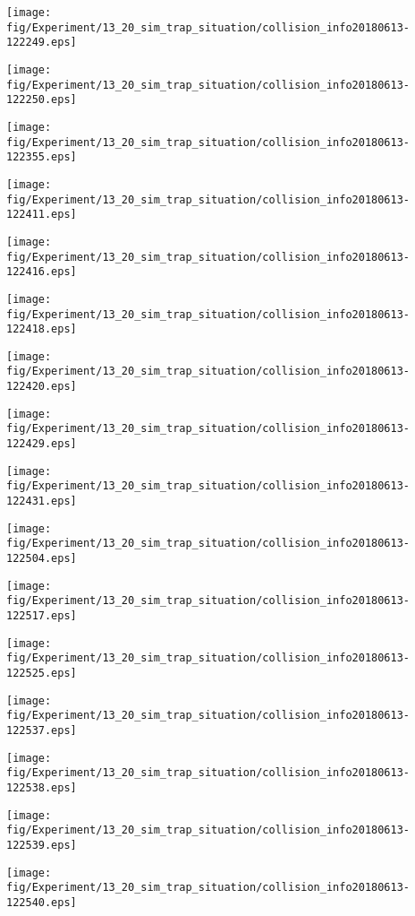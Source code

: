 \texttt{[image: fig/Experiment/13\_20\_sim\_trap\_situation/collision\_info20180613-122249.eps]}

\texttt{[image: fig/Experiment/13\_20\_sim\_trap\_situation/collision\_info20180613-122250.eps]}

\texttt{[image: fig/Experiment/13\_20\_sim\_trap\_situation/collision\_info20180613-122355.eps]}

\texttt{[image: fig/Experiment/13\_20\_sim\_trap\_situation/collision\_info20180613-122411.eps]}

\texttt{[image: fig/Experiment/13\_20\_sim\_trap\_situation/collision\_info20180613-122416.eps]}

\texttt{[image: fig/Experiment/13\_20\_sim\_trap\_situation/collision\_info20180613-122418.eps]}

\texttt{[image: fig/Experiment/13\_20\_sim\_trap\_situation/collision\_info20180613-122420.eps]}

\texttt{[image: fig/Experiment/13\_20\_sim\_trap\_situation/collision\_info20180613-122429.eps]}

\texttt{[image: fig/Experiment/13\_20\_sim\_trap\_situation/collision\_info20180613-122431.eps]}

\texttt{[image: fig/Experiment/13\_20\_sim\_trap\_situation/collision\_info20180613-122504.eps]}

\texttt{[image: fig/Experiment/13\_20\_sim\_trap\_situation/collision\_info20180613-122517.eps]}

\texttt{[image: fig/Experiment/13\_20\_sim\_trap\_situation/collision\_info20180613-122525.eps]}

\texttt{[image: fig/Experiment/13\_20\_sim\_trap\_situation/collision\_info20180613-122537.eps]}

\texttt{[image: fig/Experiment/13\_20\_sim\_trap\_situation/collision\_info20180613-122538.eps]}

\texttt{[image: fig/Experiment/13\_20\_sim\_trap\_situation/collision\_info20180613-122539.eps]}

\texttt{[image: fig/Experiment/13\_20\_sim\_trap\_situation/collision\_info20180613-122540.eps]}

